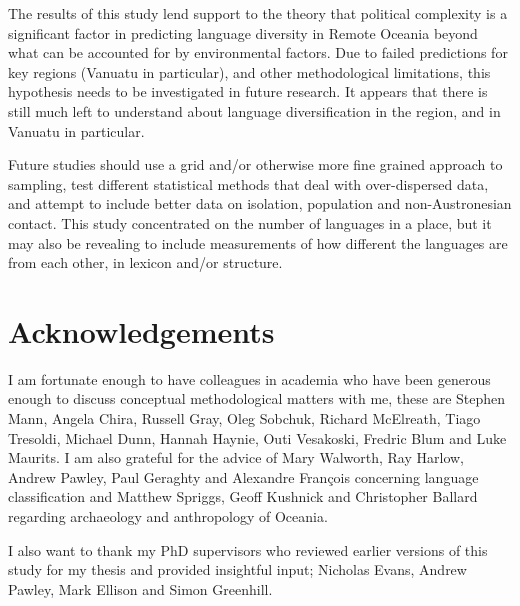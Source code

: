 \documentclass[a4paper,10pt]{article} %
\begin{document}
The results of this study lend support to the theory that political complexity is a significant factor in predicting language diversity in Remote Oceania beyond what can be accounted for by environmental factors. Due to failed predictions for key regions (Vanuatu in particular), and other methodological limitations, this hypothesis needs to be investigated in future research. It appears that there is still much left to understand about language diversification in the region, and in Vanuatu in particular.

Future studies should use a grid and/or otherwise more fine grained approach to sampling, test different statistical methods that deal with over-dispersed data, and attempt to include better data on isolation, population and non-Austronesian contact. This study concentrated on the number of languages in a place, but it may also be revealing to include measurements of how different the languages are from each other, in lexicon and/or structure.




\newpage



\newpage
\singlespacing





\newpage
\section*{Acknowledgements}
I am fortunate enough to have colleagues in academia who have been generous enough to discuss conceptual methodological matters with me, these are Stephen Mann, Angela Chira, Russell Gray, Oleg Sobchuk, Richard McElreath, Tiago Tresoldi, Michael Dunn, Hannah Haynie, Outi Vesakoski, Fredric Blum and Luke Maurits. I am also grateful for the advice of Mary Walworth, Ray Harlow, Andrew Pawley, Paul Geraghty and Alexandre François concerning language classification and Matthew Spriggs, Geoff Kushnick and Christopher Ballard regarding archaeology and anthropology of Oceania.

I also want to thank my PhD supervisors who reviewed earlier versions of this study for my thesis \citep{skirgaard2020multilevel} and provided insightful input; Nicholas Evans, Andrew Pawley, Mark Ellison and Simon Greenhill.
\end{document}
